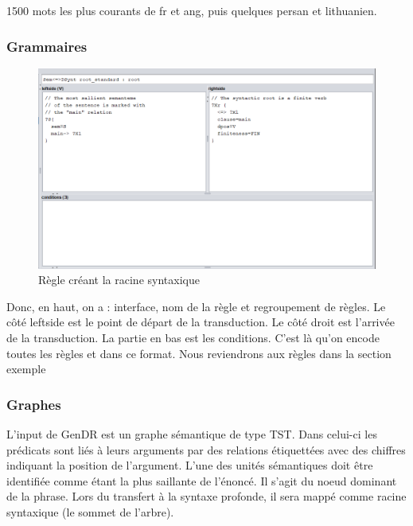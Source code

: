 1500 mots les plus courants de fr et ang, puis quelques persan et lithuanien.


\subsubsection{Grammaires}

\begin{figure}[htb]
	\centering
	\includegraphics[width=1\textwidth, trim = {0cm 0cm 0cm 0cm},clip]{ch3/figs/grammaire.png}
	\caption{Règle créant la racine syntaxique}
	\label{fig:root}
\end{figure}

Donc, en haut, on a : interface, nom de la règle et regroupement de règles. Le côté leftside est le point de départ de la transduction. Le côté droit est l'arrivée de la transduction. La partie en bas est les conditions. C'est là qu'on encode toutes les règles et dans ce format. Nous reviendrons aux règles dans la section exemple


\subsubsection{Graphes}\label{entree-sortie}
L'input de GenDR est un graphe sémantique de type TST. Dans celui-ci les prédicats sont liés à leurs arguments par des relations étiquettées avec des chiffres indiquant la position de l'argument. L'une des unités sémantiques doit être identifiée comme étant la plus saillante de l'énoncé. Il s'agit du noeud dominant de la phrase. Lors du transfert à la syntaxe profonde, il sera mappé comme racine syntaxique (le sommet de l'arbre).

